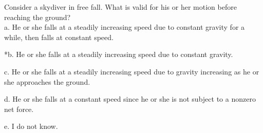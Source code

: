 
Consider a skydiver in free fall. What is valid for his or her motion before reaching the ground? \\

a. He or she falls at a steadily increasing speed due to constant gravity for a while, then falls at constant speed.

*b. He or she falls at a steadily increasing speed due to constant gravity.

c. He or she falls at a steadily increasing speed due to gravity increasing as he or she approaches the ground.

d. He or she falls at a constant speed since he or she is not subject to a nonzero net force.

e. I do not know. \\
